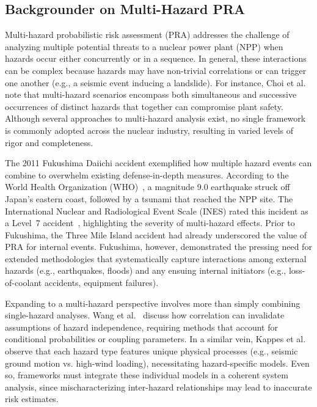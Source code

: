 \subsection{Backgrounder on Multi-Hazard PRA}

Multi-hazard probabilistic risk assessment (PRA) addresses the challenge of analyzing multiple potential threats to a nuclear power plant (NPP) when hazards occur either concurrently or in a sequence. In general, these interactions can be complex because hazards may have non-trivial correlations or can trigger one another (e.g., a seismic event inducing a landslide). For instance, Choi et al.~\cite{Choi2021review} note that multi-hazard scenarios encompass both simultaneous and successive occurrences of distinct hazards that together can compromise plant safety. Although several approaches to multi-hazard analysis exist, no single framework is commonly adopted across the nuclear industry, resulting in varied levels of rigor and completeness.

The 2011 Fukushima Daiichi accident exemplified how multiple hazard events can combine to overwhelm existing defense-in-depth measures. According to the World Health Organization (WHO)~\cite{Great}, a magnitude 9.0 earthquake struck off Japan's eastern coast, followed by a tsunami that reached the NPP site. The International Nuclear and Radiological Event Scale (INES) rated this incident as a Level~7 accident~\cite{International}, highlighting the severity of multi-hazard effects. Prior to Fukushima, the Three Mile Island accident had already underscored the value of PRA for internal events. Fukushima, however, demonstrated the pressing need for extended methodologies that systematically capture interactions among external hazards (e.g., earthquakes, floods) and any ensuing internal initiators (e.g., loss-of-coolant accidents, equipment failures).

Expanding to a multi-hazard perspective involves more than simply combining single-hazard analyses. Wang et al.~\cite{Wang2020review} discuss how correlation can invalidate assumptions of hazard independence, requiring methods that account for conditional probabilities or coupling parameters. In a similar vein, Kappes et al.~\cite{Kappes2012Challenges} observe that each hazard type features unique physical processes (e.g., seismic ground motion vs. high-wind loading), necessitating hazard-specific models. Even so, frameworks must integrate these individual models in a coherent system analysis, since mischaracterizing inter-hazard relationships may lead to inaccurate risk estimates.

